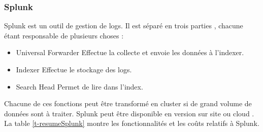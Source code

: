 \documentclass[paper=a4, fontsize=11pt]{scrartcl}
\begin{document}
\subsubsection{Splunk}
Splunk est un outil de gestion de logs. Il est séparé en trois \og parties \fg, chacune étant responsable de plusieurs choses :

\begin{itemize}
    \item Universal Forwarder
    \subitem Effectue la collecte et envoie les données à l'indexer.
    \item Indexer
    \subitem Effectue le stockage des logs.
    \item Search Head
    \subitem Permet de lire dans l'index.
\end{itemize}
Chacune de ces fonctions peut être transformé en cluster si de grand volume de données sont à traiter.
Splunk peut être disponible en version \og sur site \fg ou \og cloud \fg. La table \ref{t-resumeSplunk} montre les fonctionnalités et les coûts relatifs à Splunk.
\end{document}
